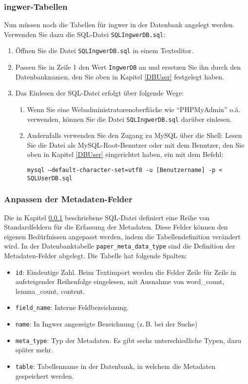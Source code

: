\documentclass[11pt]{scrartcl} %
\begin{document}
\subsubsection{ingwer-Tabellen}
\label{ingwertabs}

Nun m\"ussen noch die Tabellen f\"ur ingwer in der Datenbank angelegt werden. Verwenden Sie dazu die SQL-Datei \texttt{SQLIngwerDB.sql}:

\begin{enumerate}
\item \"Offnen Sie die Datei \texttt{SQLIngwerDB.sql} in einem Texteditor.
\item Passen Sie in Zeile 1 den Wert \texttt{IngwerDB} an und ersetzen Sie ihn durch den Datenbanknamen, den Sie oben in Kapitel \ref{DBUser} festgelegt haben.
\item Das Einlesen der SQL-Datei erfolgt \"uber folgende Wege:
\begin{enumerate}
\item Wenn Sie eine Webadministratorenoberfl\"ache wie \enquote{PHPMyAdmin} o.\"a. verwenden, k\"onnen Sie die Datei \texttt{SQLIngwerDB.sql} dar\"uber einlesen. 
\item Andernfalls verwenden Sie den Zugang zu MySQL \"uber die Shell: Lesen Sie die Datei als MySQL-Root-Benutzer oder mit dem Benutzer, den Sie oben in Kapitel \ref{DBUser} eingerichtet haben, ein mit dem Befehl:

\texttt{mysql --default-character-set=utf8 -u [Benutzername] -p < SQLUserDB.sql}
\end{enumerate}
\end{enumerate}

\subsubsection{Anpassen der Metadaten-Felder}

Die in Kapitel \ref{ingwertabs} beschriebene SQL-Datei definiert eine Reihe von Standardfeldern f\"ur die Erfassung der Metadaten. Diese Felder k\"onnen den eigenen Bed\"urfnissen angepasst werden, indem die Tabellendefinition ver\"andert wird. In der Datenbanktabelle \texttt{paper\_meta\_data\_type} sind die Definition der Metadaten-Felder abgelegt. Die Tabelle hat folgende Spalten:
\begin{itemize}
\item \texttt{id}: Eindeutige Zahl. Beim Textimport werden die Felder Zeile für Zeile in aufsteigender Reihenfolge eingelesen, mit Ausnahme von word\_count, lemma\_count, content.
\item \texttt{field\_name}: Interne Feldbezeichnung.
\item \texttt{name}: In Ingwer angezeigte Bezeichnung (z.\,B. bei der Suche)
\item \texttt{meta\_type}: Typ der Metadaten. Es gibt sechs unterschiedliche Typen, dazu sp\"ater mehr.
\item \texttt{table}: Tabellenname in der Datenbank, in welchem die Metadaten gespeichert werden.
\end{itemize}
\end{document}

